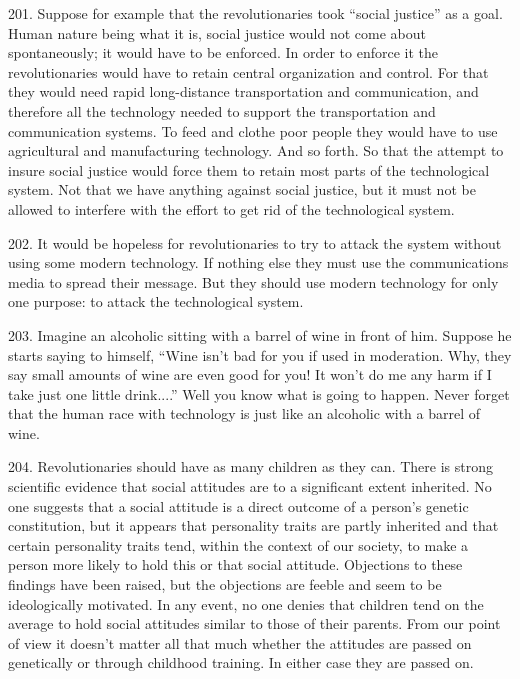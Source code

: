 \documentclass{article}
\begin{document}
201.  Suppose for example that the revolutionaries took “social justice” as a goal.  Human nature 
being  what  it  is,  social  justice  would  not  come  about  spontaneously;  it  would  have  to  be  
enforced.  In order to enforce it the revolutionaries would have to retain central organization and 
control.   For  that  they  would  need  rapid  long-distance  transportation  and  communication,  and  
therefore all the technology needed to support the transportation and communication systems.  To 
feed and clothe poor people they would have to use agricultural and manufacturing 
technology.  And so forth.  So that the attempt to insure social justice would force them to retain 
most  parts  of  the  technological  system.   Not  that  we  have  anything  against  social  justice,  but  it  
must not be allowed to interfere with the effort to get rid of the technological system. \vspace{\baselineskip}

202.  It  would  be  hopeless  for  revolutionaries  to  try  to  attack  the  system  without  using  some 
modern  technology.   If  nothing  else  they  must  use  the  communications  media  to  spread  their  
message.  But they should use modern technology for only one purpose: to attack the technological 
system. \vspace{\baselineskip}

203.  Imagine an alcoholic sitting with a barrel of wine in front of him.  Suppose he starts saying 
to himself, “Wine isn’t bad for you if used in moderation.  Why, they say small amounts of wine 
are even good for you! It won’t do me any harm if I take just one little drink....” Well you know 
what is going to happen.  Never forget that the human race with technology is just like an alcoholic 
with a barrel of wine. \vspace{\baselineskip}

204.  Revolutionaries  should  have  as  many  children  as  they  can.   There  is  strong  scientific  
evidence that social attitudes are to a significant  extent inherited.  No one suggests that a social 
attitude is a direct outcome of a person’s genetic constitution, but it appears that personality traits 
are  partly  inherited  and  that  certain  personality  traits  tend,  within  the  context  of  our  society,  to  
make a person more likely to hold this or that social attitude.  Objections to these findings have 
been raised, but the objections are feeble and seem to be ideologically motivated.  In any event, no 
one  denies  that  children  tend  on  the  average  to  hold  social  attitudes  similar  to  those  of  their  
parents.  From our point of view it doesn’t matter all that much whether the attitudes are passed 
on genetically or through childhood training.  In either case they are passed on. \vspace{\baselineskip}
\end{document}
